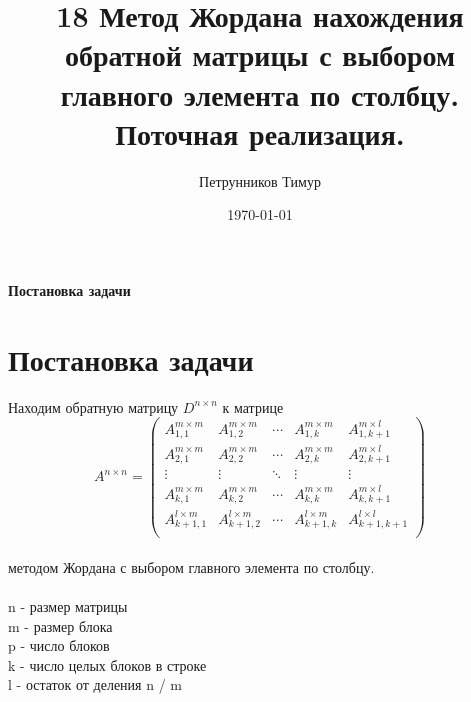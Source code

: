 \documentclass[a4paper,12pt]{article}
\begin{document}
\author{Петрунников Тимур}
\title{18 Метод Жордана нахождения обратной матрицы с выбором главного элемента по столбцу. \\ Поточная реализация.}
\date{\today}
\maketitle
\begin{center}
{\bfseries Постановка задачи}
\end{center}
\section{Постановка задачи}
Находим обратную матрицу $D^{n \times n}$ к матрице
\begin{equation}
    A^{n \times n} =
    \begin{pmatrix}
        A_{1,1}^{m\times m} & A_{1,2}^{m\times m} & \cdots & A_{1,k}^{m\times m} & A_{1,k+1}^{m\times l} \\
        A_{2,1}^{m\times m} & A_{2,2}^{m\times m} & \cdots & A_{2,k}^{m\times m} & A_{2,k+1}^{m\times l} \\
        \vdots & \vdots & \ddots & \vdots & \vdots \\
        A_{k,1}^{m\times m} & A_{k,2}^{m\times m} & \cdots & A_{k,k}^{m\times m} & A_{k,k+1}^{m\times l} \\
        A_{k+1,1}^{l\times m} & A_{k+1,2}^{l\times m} & \cdots & A_{k+1,k}^{l\times m} & A_{k+1,k+1}^{l\times l} \\
    \end{pmatrix}
\end{equation} \\
методом Жордана с выбором главного элемента по столбцу. \\ \\
n - размер матрицы \\
m - размер блока \\
p - число блоков \\
k - число целых блоков в строке \\
l - остаток от деления n / m \\
\end{document}
